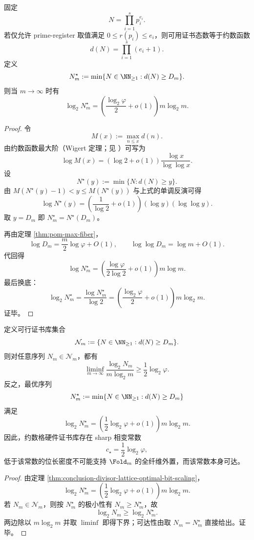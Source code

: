 \begin{theorem}[约数格硬件证书库下的最优位长尺度]\label{thm:conclusion-divisor-lattice-optimal-bit-scaling}
固定
\[
N=\prod_{i=1}^{s}p_i^{e_i}.
\]
若仅允许 prime-register 取值满足 \(0\le r(p_i)\le e_i\)，则可用证书态数等于约数函数
\[
d(N)=\prod_{i=1}^{s}(e_i+1).
\]
定义
\[
N_m^\star:=\min\{N\in\NN_{\ge 1}: d(N)\ge D_m\}.
\]
则当 \(m\to\infty\) 时有
\[
\log_2 N_m^\star
=\left(\frac{\log_2\varphi}{2}+o(1)\right)m\log_2 m.
\]
\end{theorem}
\begin{proof}
令
\[
M(x):=\max_{n\le x}d(n).
\]
由约数函数最大阶（Wigert 定理；见 \cite[Ch.~13]{Apostol1976}）可写为
\[
\log M(x)=\left(\log2+o(1)\right)\frac{\log x}{\log\log x}.
\]
设
\[
N^\star(y):=\min\{N:d(N)\ge y\}.
\]
由 \(M(N^\star(y)-1)<y\le M(N^\star(y))\) 与上式的单调反演可得
\[
\log N^\star(y)
=\left(\frac{1}{\log2}+o(1)\right)(\log y)(\log\log y).
\]
取 \(y=D_m\) 即 \(N_m^\star=N^\star(D_m)\)。

再由定理 \ref{thm:pom-max-fiber}，
\[
\log D_m=\frac{m}{2}\log\varphi+O(1),\qquad
\log\log D_m=\log m+O(1).
\]
代回得
\[
\log N_m^\star
=\left(\frac{\log\varphi}{2\log2}+o(1)\right)m\log m.
\]
最后换底：
\[
\log_2 N_m^\star
=\frac{\log N_m^\star}{\log2}
=\left(\frac{\log_2\varphi}{2}+o(1)\right)m\log_2 m.
\]
证毕。
\end{proof}

\begin{corollary}\label{cor:conclusion-divisor-lattice-sharp-phase-constant}
定义可行证书库集合
\[
\mathcal N_m:=\{N\in\NN_{\ge 1}: d(N)\ge D_m\}.
\]
则对任意序列 \(N_m\in\mathcal N_m\)，都有
\[
\liminf_{m\to\infty}\frac{\log_2 N_m}{m\log_2 m}
\ge
\frac12\log_2\varphi.
\]
反之，最优序列
\[
N_m^\star:=\min\{N\in\NN_{\ge 1}: d(N)\ge D_m\}
\]
满足
\[
\log_2 N_m^\star
=
\left(\frac12\log_2\varphi+o(1)\right)m\log_2 m.
\]
因此，约数格硬件证书库存在 sharp 相变常数
\[
c_\star=\frac12\log_2\varphi,
\]
低于该常数的位长密度不可能支持 \(\Fold_m\) 的全纤维外置，而该常数本身可达。
\end{corollary}
\begin{proof}
由定理 \ref{thm:conclusion-divisor-lattice-optimal-bit-scaling}，
\[
\log_2 N_m^\star
=
\left(\frac12\log_2\varphi+o(1)\right)m\log_2 m.
\]
若 \(N_m\in\mathcal N_m\)，则按 \(N_m^\star\) 的极小性有 \(N_m\ge N_m^\star\)，故
\[
\log_2 N_m\ge \log_2 N_m^\star.
\]
两边除以 \(m\log_2 m\) 并取 \(\liminf\) 即得下界；可达性由取 \(N_m=N_m^\star\) 直接给出。证毕。
\end{proof}

